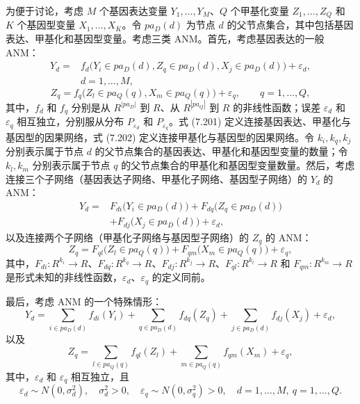 为便于讨论，考虑 $M$ 个基因表达变量 $Y_1,\ldots,Y_M$、$Q$ 个甲基化变量 $Z_1,\ldots,Z_Q$ 和 $K$ 个基因型变量 $X_1,\ldots,X_K$。令 $pa_D(d)$ 为节点 $d$ 的父节点集合，其中包括基因表达、甲基化和基因型变量。考虑三类 ANM。首先，考虑基因表达的一般 ANM：
\begin{equation}
\begin{aligned}
Y_d={}&f_d\bigl(Y_i\in pa_D(d),Z_q\in pa_D(d),X_j\in pa_D(d)\bigr)+\varepsilon_d,\\
&d=1,\ldots,M,
\end{aligned}
\tag{7.201}
\end{equation}
\begin{equation}
Z_q=f_q\bigl(Z_l\in pa_Q(q),X_m\in pa_Q(q)\bigr)+\varepsilon_q,\qquad q=1,\ldots,Q,
\tag{7.202}
\end{equation}
其中，$f_d$ 和 $f_q$ 分别是从 $R^{|pa_D|}$ 到 $R$、从 $R^{|pa_Q|}$ 到 $R$ 的非线性函数；误差 $\varepsilon_d$ 和 $\varepsilon_q$ 相互独立，分别服从分布 $P_{\varepsilon_d}$ 和 $P_{\varepsilon_q}$。式 (7.201) 定义连接基因表达、甲基化与基因型的因果网络，式 (7.202) 定义连接甲基化与基因型的因果网络。令 $k_i,k_q,k_j$ 分别表示属于节点 $d$ 的父节点集合的基因表达、甲基化和基因型变量的数量；令 $k_l,k_m$ 分别表示属于节点 $q$ 的父节点集合的甲基化和基因型变量数量。然后，考虑连接三个子网络（基因表达子网络、甲基化子网络、基因型子网络）的 $Y_d$ 的 ANM：
\begin{equation}
\begin{aligned}
Y_d={}&F_{di}\bigl(Y_i\in pa_D(d)\bigr)+F_{dq}\bigl(Z_q\in pa_D(d)\bigr)\\
&+F_{dj}\bigl(X_j\in pa_D(d)\bigr)+\varepsilon_d,
\end{aligned}
\tag{7.203}
\end{equation}
以及连接两个子网络（甲基化子网络与基因型子网络）的 $Z_q$ 的 ANM：
\begin{equation}
Z_q=F_{ql}\bigl(Z_l\in pa_Q(q)\bigr)+F_{qm}\bigl(X_m\in pa_Q(q)\bigr)+\varepsilon_q,
\tag{7.204}
\end{equation}
其中，$F_{di}:R^{k_i}\to R$、$F_{dq}:R^{k_q}\to R$、$F_{dj}:R^{k_j}\to R$、$F_{ql}:R^{k_l}\to R$ 和 $F_{qm}:R^{k_m}\to R$ 是形式未知的非线性函数，$\varepsilon_d$、$\varepsilon_q$ 的定义同前。

最后，考虑 ANM 的一个特殊情形：
\begin{equation}
Y_d=\sum_{i\in pa_D(d)}f_{di}(Y_i)+\sum_{q\in pa_D(d)}f_{dq}(Z_q)
+\sum_{j\in pa_D(d)}f_{dj}(X_j)+\varepsilon_d,
\tag{7.205}
\end{equation}
以及
\begin{equation}
Z_q=\sum_{l\in pa_Q(q)}f_{ql}(Z_l)+\sum_{m\in pa_Q(q)}f_{qm}(X_m)+\varepsilon_q,
\tag{7.206}
\end{equation}
其中，$\varepsilon_d$ 和 $\varepsilon_q$ 相互独立，且
\[
\varepsilon_d\sim N(0,\sigma_d^2),\quad \sigma_d^2>0,\quad
\varepsilon_q\sim N(0,\sigma_q^2)>0,\quad d=1,\ldots,M,\ q=1,\ldots,Q.
\]

